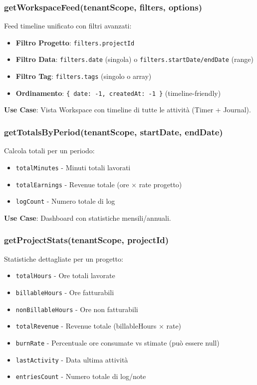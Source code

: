 \documentclass[11pt,a4paper]{article}
\begin{document}
\subsubsection{getWorkspaceFeed(tenantScope, filters, options)}

Feed timeline unificato con filtri avanzati:

\begin{itemize}
    \item \textbf{Filtro Progetto}: \texttt{filters.projectId}
    \item \textbf{Filtro Data}: \texttt{filters.date} (singola) o \texttt{filters.startDate/endDate} (range)
    \item \textbf{Filtro Tag}: \texttt{filters.tags} (singolo o array)
    \item \textbf{Ordinamento}: \texttt{\{ date: -1, createdAt: -1 \}} (timeline-friendly)
\end{itemize}

\textbf{Use Case}: Vista Workspace con timeline di tutte le attività (Timer + Journal).

\subsubsection{getTotalsByPeriod(tenantScope, startDate, endDate)}

Calcola totali per un periodo:

\begin{itemize}
    \item \texttt{totalMinutes} - Minuti totali lavorati
    \item \texttt{totalEarnings} - Revenue totale (ore × rate progetto)
    \item \texttt{logCount} - Numero totale di log
\end{itemize}

\textbf{Use Case}: Dashboard con statistiche mensili/annuali.

\subsubsection{getProjectStats(tenantScope, projectId)}

Statistiche dettagliate per un progetto:

\begin{itemize}
    \item \texttt{totalHours} - Ore totali lavorate
    \item \texttt{billableHours} - Ore fatturabili
    \item \texttt{nonBillableHours} - Ore non fatturabili
    \item \texttt{totalRevenue} - Revenue totale (billableHours × rate)
    \item \texttt{burnRate} - Percentuale ore consumate vs stimate (può essere null)
    \item \texttt{lastActivity} - Data ultima attività
    \item \texttt{entriesCount} - Numero totale di log/note
\end{itemize}
\end{document}
